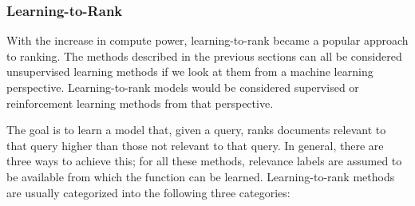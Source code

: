 \subsubsection{Learning-to-Rank}
With the increase in compute power, learning-to-rank became a popular approach to ranking. The methods described in the previous sections can all be considered unsupervised learning methods if we look at them from a machine learning perspective. Learning-to-rank models would be considered supervised or reinforcement learning methods from that perspective. 

The goal is to learn a model that, given a query, ranks documents relevant to that query higher than those not relevant to that query. In general, there are three ways to achieve this; for all these methods, relevance labels are assumed to be available from which the function can be learned. Learning-to-rank methods are usually categorized into the following three categories: 

